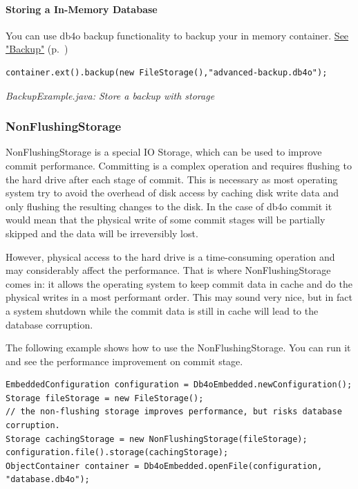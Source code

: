 \paragraph{Storing a In-Memory Database}
\label{ref:configuration-file-storage-memory-storage-storing-memorybin-data}

You can use db4o backup functionality to backup your in memory container. \hyperref[ref:advanced-topics-backup]{See "Backup"} (p.~\pageref{ref:advanced-topics-backup})

\begin{lstlisting}
container.ext().backup(new FileStorage(),"advanced-backup.db4o");
\end{lstlisting}

{\small\itshape BackupExample.java: Store a backup with storage\par}
\medskip

\subsubsection{NonFlushingStorage}
\label{ref:configuration-file-storage-nonflushingstorage}

NonFlushingStorage is a special IO Storage, which can be used to improve commit performance. Committing is a complex operation and requires flushing to the hard drive after each stage of commit. This is necessary as most operating system try to avoid the overhead of disk access by caching disk write data and only flushing the resulting changes to the disk. In the case of db4o commit it would mean that the physical write of some commit stages will be partially skipped and the data will be irreversibly lost.

However, physical access to the hard drive is a time-consuming operation and may considerably affect the performance. That is where NonFlushingStorage comes in: it allows the operating system to keep commit data in cache and do the physical writes in a most performant order. This may sound very nice, but in fact a system shutdown while the commit data is still in cache will lead to the database corruption.

The following example shows how to use the NonFlushingStorage. You can run it and see the performance improvement on commit stage.

\begin{lstlisting}
EmbeddedConfiguration configuration = Db4oEmbedded.newConfiguration();
Storage fileStorage = new FileStorage();
// the non-flushing storage improves performance, but risks database corruption.
Storage cachingStorage = new NonFlushingStorage(fileStorage);
configuration.file().storage(cachingStorage);
ObjectContainer container = Db4oEmbedded.openFile(configuration, "database.db4o");
\end{lstlisting}

